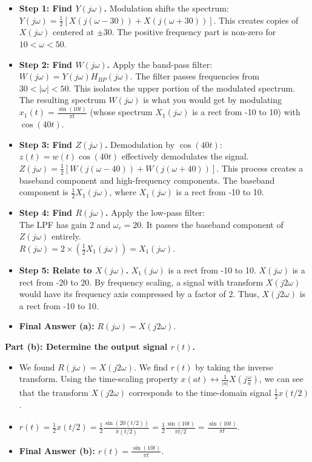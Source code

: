 \documentclass[10pt, twocolumn]{article}
\begin{document}
\begin{itemize}
    \item \textbf{Step 1: Find $Y(j\omega)$.} Modulation shifts the spectrum: \\
    $Y(j\omega) = \frac{1}{2}[X(j(\omega-30)) + X(j(\omega+30))]$. This creates copies of $X(j\omega)$ centered at $\pm 30$. The positive frequency part is non-zero for $10 < \omega < 50$.
    \item \textbf{Step 2: Find $W(j\omega)$.} Apply the band-pass filter: \\
    $W(j\omega) = Y(j\omega)H_{BP}(j\omega)$. The filter passes frequencies from $30 < |\omega| < 50$. This isolates the upper portion of the modulated spectrum. The resulting spectrum $W(j\omega)$ is what you would get by modulating $x_1(t) = \frac{\sin(10t)}{\pi t}$ (whose spectrum $X_1(j\omega)$ is a rect from -10 to 10) with $\cos(40t)$.
    \item \textbf{Step 3: Find $Z(j\omega)$.} Demodulation by $\cos(40t)$: \\
    $z(t) = w(t)\cos(40t)$ effectively demodulates the signal.
    $Z(j\omega) = \frac{1}{2}[W(j(\omega-40)) + W(j(\omega+40))]$. This process creates a baseband component and high-frequency components. The baseband component is $\frac{1}{2} X_1(j\omega)$, where $X_1(j\omega)$ is a rect from -10 to 10.
    \item \textbf{Step 4: Find $R(j\omega)$.} Apply the low-pass filter: \\
    The LPF has gain 2 and $\omega_c=20$. It passes the baseband component of $Z(j\omega)$ entirely. \\
    $R(j\omega) = 2 \times (\frac{1}{2} X_1(j\omega)) = X_1(j\omega)$.
    \item \textbf{Step 5: Relate to $X(j\omega)$.} $X_1(j\omega)$ is a rect from -10 to 10. $X(j\omega)$ is a rect from -20 to 20. By frequency scaling, a signal with transform $X(j2\omega)$ would have its frequency axis compressed by a factor of 2. Thus, $X(j2\omega)$ is a rect from -10 to 10.
    \item \textbf{Final Answer (a):} $R(j\omega) = X(j2\omega)$.
\end{itemize}
\noindent\textbf{Part (b): Determine the output signal $r(t)$.}
\begin{itemize}
    \item We found $R(j\omega) = X(j2\omega)$. We find $r(t)$ by taking the inverse transform. Using the time-scaling property $x(at) \leftrightarrow \frac{1}{|a|}X(j\frac{\omega}{a})$, we can see that the transform $X(j2\omega)$ corresponds to the time-domain signal $\frac{1}{2}x(t/2)$.
    \item $r(t) = \frac{1}{2}x(t/2) = \frac{1}{2} \frac{\sin(20(t/2))}{\pi(t/2)} = \frac{1}{2} \frac{\sin(10t)}{\pi t / 2} = \frac{\sin(10t)}{\pi t}$.
    \item \textbf{Final Answer (b):} $r(t) = \frac{\sin(10t)}{\pi t}$.
\end{itemize}
\end{document}
